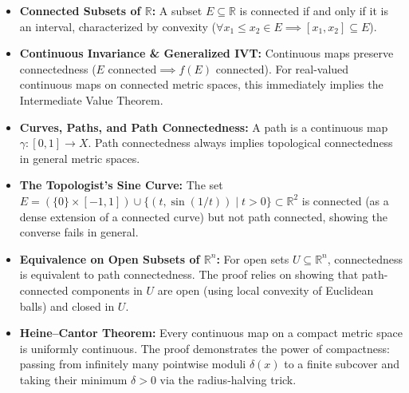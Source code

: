 \begin{overview}
\begin{itemize}
    \item \textbf{Connected Subsets of $\mathbb{R}$:} A subset $E \subseteq \mathbb{R}$ is connected if and only if it is an interval, characterized by convexity ($\forall x_1 \le x_2 \in E \implies [x_1, x_2] \subseteq E$).
    \item \textbf{Continuous Invariance \& Generalized IVT:} Continuous maps preserve connectedness ($E \text{ connected} \implies f(E) \text{ connected}$). For real-valued continuous maps on connected metric spaces, this immediately implies the Intermediate Value Theorem.
    \item \textbf{Curves, Paths, and Path Connectedness:} A path is a continuous map $\gamma \colon [0, 1] \to X$. Path connectedness always implies topological connectedness in general metric spaces.
    \item \textbf{The Topologist's Sine Curve:} The set $E = (\{0\} \times [-1, 1]) \cup \{(t, \sin(1/t)) \mid t > 0\} \subset \mathbb{R}^2$ is connected (as a dense extension of a connected curve) but not path connected, showing the converse fails in general.
    \item \textbf{Equivalence on Open Subsets of $\mathbb{R}^n$:} For open sets $U \subseteq \mathbb{R}^n$, connectedness is equivalent to path connectedness. The proof relies on showing that path-connected components in $U$ are open (using local convexity of Euclidean balls) and closed in $U$.
    \item \textbf{Heine--Cantor Theorem:} Every continuous map on a compact metric space is uniformly continuous. The proof demonstrates the power of compactness: passing from infinitely many pointwise moduli $\delta(x)$ to a finite subcover and taking their minimum $\delta > 0$ via the radius-halving trick.
\end{itemize}
\end{overview}